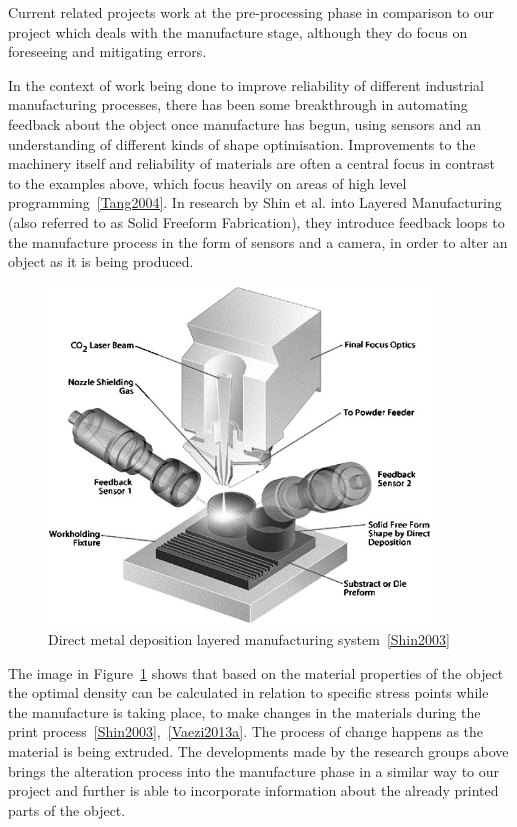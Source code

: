 \documentclass[11pt]{report} %
\begin{document}
Current related projects work at the pre-processing phase in comparison to our project which deals with the manufacture stage, although they do focus on foreseeing and mitigating errors. 

In the context of work being done to improve reliability of different industrial manufacturing processes, there has been some breakthrough in automating feedback about the object once manufacture has begun, using sensors and an understanding of different kinds of shape optimisation. Improvements to the machinery itself and reliability of materials are often a central focus in contrast to the examples above, which focus heavily on areas of high level programming~\ref{Tang2004}. In research by Shin et al. into Layered Manufacturing (also referred to as Solid Freeform Fabrication), they introduce feedback loops to the manufacture process in the form of sensors and a camera, in order to alter an object as it is being produced.

\begin{figure}[H]
  \centering
  \includegraphics[width=4in]{shin.jpg}
  \caption{Direct metal deposition layered manufacturing system~\ref{Shin2003}}
  \label{figure:Shin}
\end{figure}

The image in Figure~\ref{figure:Shin} shows that based on the material properties of the object the optimal density can be calculated in relation to specific stress points while the manufacture is taking place, to make changes in the materials during the print process~\ref{Shin2003},~\ref{Vaezi2013a}. The process of change happens as the material is being extruded. The developments made by the research groups above brings the alteration process into the manufacture phase in a similar way to our project and further is able to incorporate information about the already printed parts of the object.  
\end{document}
